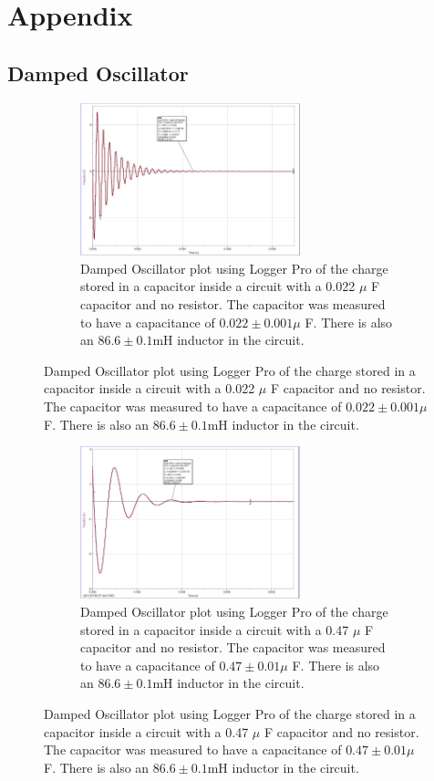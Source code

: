 \documentclass[12pt]{article}
\begin{document}
\clearpage
\appendix
\section{Appendix}
\subsection{Damped Oscillator}

\begin{figure} [h]
    \begin{subfigure}
        \centering
        \includegraphics[width=0.7\textwidth]{figures/images/LCR_D1_Logger-Plot.jpg}
        \caption{Damped Oscillator plot using Logger Pro of the charge stored in a capacitor inside a circuit with a 0.022 $\mu$ F capacitor and no resistor. The capacitor was measured to have a capacitance of $0.022\pm0.001\mu$ F. There is also an $86.6\pm0.1$mH inductor in the circuit.}
        \label{fig:D1_022C_0R}
    \end{subfigure}
\end{figure}

\begin{figure} [h]
    \begin{subfigure}
        \centering
        \includegraphics[width=0.7\textwidth]{figures/images/LCR_D2_Logger-Plot.jpg}
        \caption{Damped Oscillator plot using Logger Pro of the charge stored in a capacitor inside a circuit with a 0.47 $\mu$ F capacitor and no resistor. The capacitor was measured to have a capacitance of $0.47\pm0.01\mu$ F. There is also an $86.6\pm0.1$mH inductor in the circuit.}
        \label{fig:D2_47C_0R}
    \end{subfigure}
\end{figure}
\end{document}
